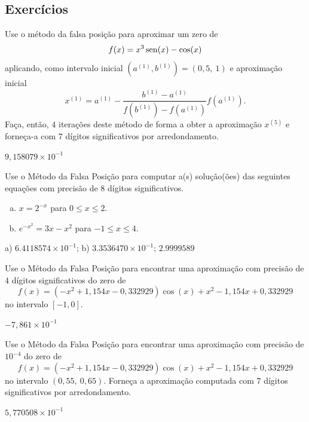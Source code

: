 \subsection{Exercícios}

\begin{exer}
  Use o método da falsa posição para aproximar um zero de
  \begin{equation}
    f(x)=x^3\operatorname{sen}(x)-\cos(x)
  \end{equation}
  aplicando, como intervalo inicial $(a^{(1)}, b^{(1)}) = (0,5, ~1)$ e aproximação inicial
  \begin{equation}
    x^{(1)} = a^{(1)} - \frac{b^{(1)}-a^{(1)}}{f(b^{(1)})-f(a^{(1)})}f(a^{(1)}).
  \end{equation}
  Faça, então, $4$ iterações deste método de forma a obter a aproximação $x^{(5)}$ e forneça-a com $7$ dígitos significativos por arredondamento.
\end{exer}
\begin{resp}
  $9,158079\times 10^{-1}$
\end{resp}

\begin{exer}
  Use o Método da Falsa Posição para computar a(s) solução(ões) das seguintes equações com precisão de 8 dígitos significativos.
  \begin{enumerate}[a)]
  \item $x = 2^{-x}$ para $0\leq x \leq 2$.
  \item $e^{-x^2} = 3x - x^2$ para $-1\leq x\leq 4$.
  \end{enumerate}
\end{exer}
\begin{resp}
  a) $6.4118574\times 10^{-1}$; b) $3.3536470\times 10^{-1}$; $2.9999589$
\end{resp}

\begin{exer}
  Use o Método da Falsa Posição para encontrar uma aproximação com precisão de $4$ dígitos significativos do zero de 
  \begin{equation}
    f(x) = (-x^2+1,154x-0,332929)\cos(x) + x^2 - 1,154x + 0,332929
  \end{equation}
  no intervalo $[-1, 0]$.
\end{exer}
\begin{resp}
  $-7,861\times 10^{-1}$
\end{resp}

\begin{exer}
  Use o Método da Falsa Posição para encontrar uma aproximação com precisão de $10^{-4}$ do zero de
  \begin{equation}
    f(x) = (-x^2+1,154x-0,332929)\cos(x) + x^2 - 1,154x + 0,332929
  \end{equation}
no intervalo $(0,55, ~0,65)$. Forneça a aproximação computada com $7$ dígitos significativos por arredondamento.
\end{exer}
\begin{resp}
  $5,770508\times 10^{-1}$
\end{resp}


